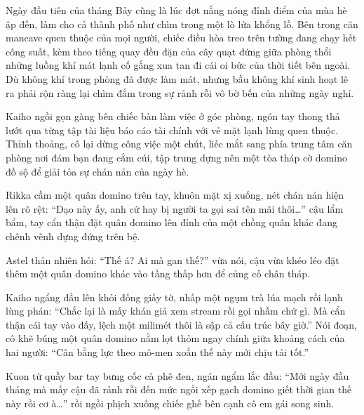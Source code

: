 \documentclass[../main.tex]{subfiles}
\begin{document}

Ngày đầu tiên của tháng Bảy cũng là lúc đợt nắng nóng đỉnh điểm của mùa hè ập đến, làm cho cả thành phố như chìm trong một lò lửa khổng lồ. Bên trong căn mancave quen thuộc của mọi người, chiếc điều hòa treo trên tường đang chạy hết công suất, kèm theo tiếng quay đều đặn của cây quạt đứng giữa phòng thổi những luồng khí mát lạnh cố gắng xua tan đi cái oi bức của thời tiết bên ngoài. Dù không khí trong phòng đã được làm mát, nhưng bầu không khí sinh hoạt lẽ ra phải rộn ràng lại chìm đắm trong sự rảnh rỗi vô bờ bến của những ngày nghỉ.

Kaiho ngồi gọn gàng bên chiếc bàn làm việc ở góc phòng, ngón tay thong thả lướt qua từng tập tài liệu báo cáo tài chính với vẻ mặt lạnh lùng quen thuộc. Thỉnh thoảng, cô lại dừng công việc một chút, liếc mắt sang phía trung tâm căn phòng nơi đám bạn đang cắm cúi, tập trung dựng nên một tòa tháp cờ domino đồ sộ để giải tỏa sự chán nản của ngày hè.

Rikka cầm một quân domino trên tay, khuôn mặt xị xuống, nét chán nản hiện lên rõ rệt: ``Dạo này ấy, anh cứ hay bị người ta gọi sai tên mãi thôi\dots'' cậu lẩm bẩm, tay cẩn thận đặt quân domino lên đỉnh của một chồng quân khác đang chênh vênh dựng đứng trên bệ.

Astel thản nhiên hỏi: ``Thế á? Ai mà gan thế?'' vừa nói, cậu vừa khéo léo đặt thêm một quân domino khác vào tầng thấp hơn để củng cố chân tháp.

Kaiho ngẩng đầu lên khỏi đống giấy tờ, nhấp một ngụm trà lúa mạch rồi lạnh lùng phán: ``Chắc lại là mấy khán giả xem stream rồi gọi nhầm chứ gì. Mà cẩn thận cái tay vào đấy, lệch một milimét thôi là sập cả cấu trúc bây giờ.'' Nói đoạn, cô khẽ búng một quân domino nằm lọt thỏm ngay chính giữa khoảng cách của hai người: ``Cân bằng lực theo mô-men xoắn thế này mới chịu tải tốt.''

Kuon từ quầy bar tay bưng cốc cà phê đen, ngán ngẩm lắc đầu: ``Mới ngày đầu tháng mà mấy cậu đã rảnh rỗi đến mức ngồi xếp gạch domino giết thời gian thế này rồi cơ à\dots'' rồi ngồi phịch xuống chiếc ghế bên cạnh cô em gái song sinh.
\end{document}
